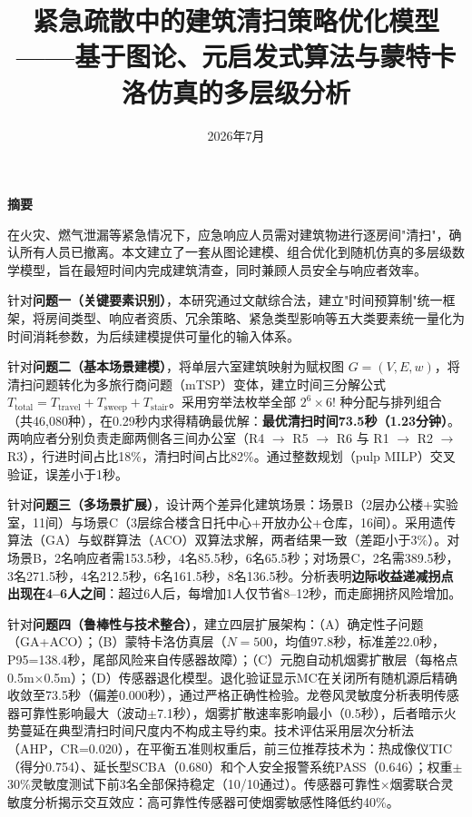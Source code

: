\documentclass[12pt,a4paper]{ctexart}
\title{\textbf{\Large 紧急疏散中的建筑清扫策略优化模型}\\[6pt]
       \large ——基于图论、元启发式算法与蒙特卡洛仿真的多层级分析}
\author{}
\date{2026年7月}
\begin{document}
\maketitle
\thispagestyle{empty}

\newpage
\begin{center}
    \textbf{摘\quad 要}
\end{center}
\vspace{8pt}

在火灾、燃气泄漏等紧急情况下，应急响应人员需对建筑物进行逐房间"清扫"，确认所有人员已撤离。本文建立了一套从图论建模、组合优化到随机仿真的多层级数学模型，旨在最短时间内完成建筑清查，同时兼顾人员安全与响应者效率。

针对\textbf{问题一（关键要素识别）}，本研究通过文献综合法，建立"时间预算制"统一框架，将房间类型、响应者资质、冗余策略、紧急类型影响等五大类要素统一量化为时间消耗参数，为后续建模提供可量化的输入体系。

针对\textbf{问题二（基本场景建模）}，将单层六室建筑映射为赋权图 $G=(V,E,w)$，将清扫问题转化为多旅行商问题（mTSP）变体，建立时间三分解公式 $T_{\text{total}} = T_{\text{travel}} + T_{\text{sweep}} + T_{\text{stair}}$。采用穷举法枚举全部 $2^6\times 6!$ 种分配与排列组合（共46,080种），在0.29秒内求得精确最优解：\textbf{最优清扫时间73.5秒（1.23分钟）}。两响应者分别负责走廊两侧各三间办公室（R4 $\rightarrow$ R5 $\rightarrow$ R6 与 R1 $\rightarrow$ R2 $\rightarrow$ R3），行进时间占比18\%，清扫时间占比82\%。通过整数规划（pulp MILP）交叉验证，误差小于1秒。

针对\textbf{问题三（多场景扩展）}，设计两个差异化建筑场景：场景B（2层办公楼+实验室，11间）与场景C（3层综合楼含日托中心+开放办公+仓库，16间）。采用遗传算法（GA）与蚁群算法（ACO）双算法求解，两者结果一致（差距小于3\%）。对场景B，2名响应者需153.5秒，4名85.5秒，6名65.5秒；对场景C，2名需389.5秒，3名271.5秒，4名212.5秒，6名161.5秒，8名136.5秒。分析表明\textbf{边际收益递减拐点出现在4--6人之间}：超过6人后，每增加1人仅节省8--12秒，而走廊拥挤风险增加。

针对\textbf{问题四（鲁棒性与技术整合）}，建立四层扩展架构：（A）确定性子问题（GA+ACO）；（B）蒙特卡洛仿真层（$N=500$，均值97.8秒，标准差22.0秒，P95=138.4秒，尾部风险来自传感器故障）；（C）元胞自动机烟雾扩散层（每格点0.5m$\times$0.5m）；（D）传感器退化模型。退化验证显示MC在关闭所有随机源后精确收敛至73.5秒（偏差0.000秒），通过严格正确性检验。龙卷风灵敏度分析表明传感器可靠性影响最大（波动$\pm$7.1秒），烟雾扩散速率影响最小（0.5秒），后者暗示火势蔓延在典型清扫时间尺度内不构成主导约束。技术评估采用层次分析法（AHP，CR=0.020），在平衡五准则权重后，前三位推荐技术为：热成像仪TIC（得分0.754）、延长型SCBA（0.680）和个人安全报警系统PASS（0.646）；权重$\pm$30\%灵敏度测试下前3名全部保持稳定（10/10通过）。传感器可靠性$\times$烟雾联合灵敏度分析揭示交互效应：高可靠性传感器可使烟雾敏感性降低约40\%。
\end{document}
